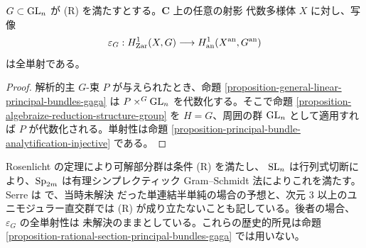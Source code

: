 \begin{proposition}
\label{proposition-rational-section-principal-bundles-gaga}
\begin{reference}
\cite[\S 4、第20項、命題20]{GAGA}
\end{reference}
$G\subset\mathop{\rm GL}_n$ が \textup{(R)} を満たすとする。$\mathbf C$ 上の任意の射影
代数多様体 $X$ に対し、写像
$$
\varepsilon_G:H^1_{\rm Zar}(X,G)
\longrightarrow H^1_{\rm an}(X^{\rm an},G^{\rm an})
$$
は全単射である。
\end{proposition}

\begin{proof}
解析的主 $G$-束 $P$ が与えられたとき、命題
\ref{proposition-general-linear-principal-bundles-gaga} は
$P\times^G\mathop{\rm GL}_n$ を代数化する。そこで命題
\ref{proposition-algebraize-reduction-structure-group} を $H=G$、周囲の群
$\mathop{\rm GL}_n$ として適用すれば $P$ が代数化される。単射性は命題
\ref{proposition-principal-bundle-analytification-injective} である。
\end{proof}

\begin{remark}[例と歴史的境界]
\label{remark-rational-section-condition-examples}
Rosenlicht の定理により可解部分群は条件 \textup{(R)} を満たし、
$\mathop{\rm SL}_n$ は行列式切断により、$\mathop{\rm Sp}_{2m}$ は有理シンプレクティック
Gram--Schmidt 法によりこれを満たす。Serre は \cite[\S 4、第20項]{GAGA} で、当時未解決
だった単連結半単純の場合の予想と、次元 $3$ 以上のユニモジュラー直交群では
\textup{(R)} が成り立たないことも記している。後者の場合、$\varepsilon_G$ の全単射性は
未解決のままとしている。これらの歴史的所見は命題
\ref{proposition-rational-section-principal-bundles-gaga} では用いない。
\end{remark}







